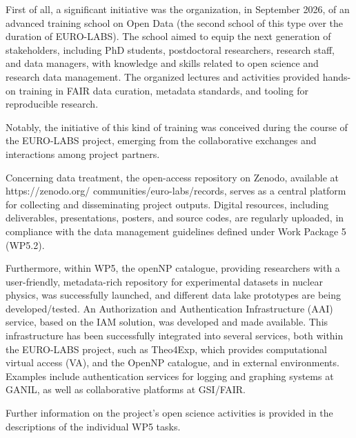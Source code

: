First of all, a significant initiative was the organization, in September 2026, of an advanced training school on Open Data 
(the second school of this type over the duration of EURO-LABS). The school aimed to equip the next generation of stakeholders, including PhD students, postdoctoral researchers, research staff, and data managers, with knowledge and skills related to open science and research data management. 
The organized lectures and activities provided hands-on training
in FAIR data curation, metadata standards, and tooling for reproducible research.

Notably, the initiative of this kind of training was conceived during the course of the EURO-LABS project, emerging from the collaborative exchanges and interactions among project partners.

Concerning data treatment, 
the open-access repository on Zenodo, available at https://zenodo.org/ communities/euro-labs/records, serves as a central platform for collecting and disseminating project outputs. Digital resources, including deliverables, presentations, posters, and source codes, are regularly uploaded, in compliance with the data management guidelines defined under Work Package 5 (WP5.2).

Furthermore, within WP5, 
the openNP catalogue, providing
researchers with a user-friendly, metadata-rich repository for experimental datasets in nuclear physics,
was successfully launched, and 
different data lake prototypes are being developed/tested.
An Authorization and Authentication Infrastructure (AAI) service, based on the IAM solution, was developed and made available. This infrastructure has been successfully integrated into several services, both within the EURO-LABS project, such as Theo4Exp, which provides computational virtual access (VA), and the OpenNP catalogue, and in external environments. Examples include authentication services for logging and graphing systems at GANIL, as well as collaborative platforms at GSI/FAIR.


Further information on the project's open science activities is provided in the descriptions of the individual WP5 tasks.
